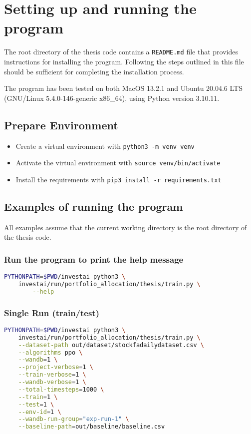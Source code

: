 \documentclass[../xlapes02]{subfiles}
\begin{document}
    \chapter{Setting up and running the program}
    The root directory of the thesis code contains a \texttt{README.md} file that provides instructions for installing the program. Following the steps outlined in this file should be sufficient for completing the installation process.

    The program has been tested on both MacOS 13.2.1 and Ubuntu 20.04.6 LTS (GNU/Linux 5.4.0-146-generic x86\_64), using Python version 3.10.11.


    \section{Prepare Environment}
    \begin{itemize}
        \item Create a virtual environment with \texttt{python3 -m venv venv}
        \item Activate the virtual environment with \texttt{source venv/bin/activate}
        \item Install the requirements with \texttt{pip3 install -r requirements.txt}
    \end{itemize}


    \section{Examples of running the program}
    All examples assume that the current working directory is the root directory of the thesis code.

    \subsection{Run the program to print the help message}
    \begin{lstlisting}[language=bash]
PYTHONPATH=$PWD/investai python3 \
    investai/run/portfolio_allocation/thesis/train.py \
        --help
    \end{lstlisting}

    \subsection{Single Run (train/test)}
    \begin{lstlisting}[language=bash]
PYTHONPATH=$PWD/investai python3 \
    investai/run/portfolio_allocation/thesis/train.py \
    --dataset-path out/dataset/stockfadailydataset.csv \
    --algorithms ppo \
    --wandb=1 \
    --project-verbose=1 \
    --train-verbose=1 \
    --wandb-verbose=1 \
    --total-timesteps=1000 \
    --train=1 \
    --test=1 \
    --env-id=1 \
    --wandb-run-group="exp-run-1" \
    --baseline-path=out/baseline/baseline.csv
    \end{lstlisting}
\end{document}

